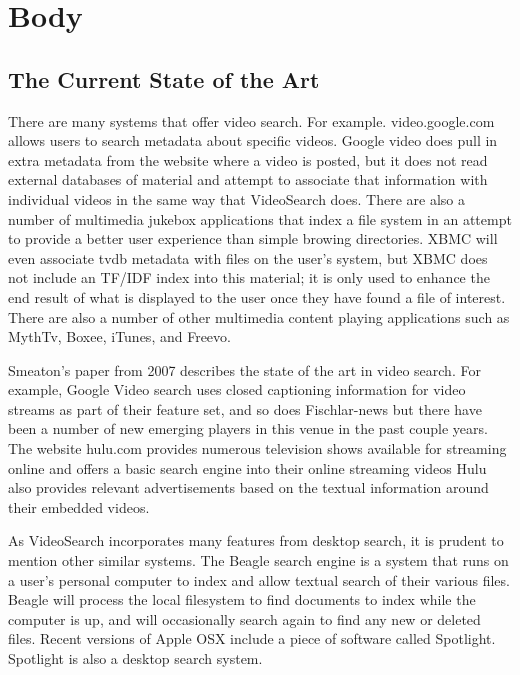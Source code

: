 \documentclass{acm_proc_article-sp}
\begin{document}
\section{Body}
\subsection{The Current State of the Art}

    There are many systems that offer video search.  For example. video.google.com allows users to search metadata about specific videos.  Google video does pull in extra metadata from the website where a video is posted, but it does not read external databases of material and attempt to associate that information with individual videos in the same way that VideoSearch does.  There are also a number of multimedia jukebox applications that index a file system in an attempt to provide a better user experience than simple browing directories. XBMC will even associate tvdb metadata with files on the user’s system\cite{goodwin2010appliance}, but XBMC does not include an TF/IDF index into this material; it is only used to enhance the end result of what is displayed to the user once they have found a file of interest. There are also a number of other multimedia content playing applications such as MythTv, Boxee, iTunes, and Freevo.\cite{schopman2010notube}

    Smeaton’s paper from 2007 describes the state of the art in video search. \cite{smeaton2007techniques} For example, Google Video search uses closed captioning information for video streams as part of their feature set, and so does Fischlar-news \cite{lee2006user} but there have been a number of new emerging players in this venue in the past couple years.  The website hulu.com provides numerous television shows available for streaming online and offers a basic search engine into their online streaming videos \cite{patent:20100287474} Hulu also provides relevant advertisements based on the textual information around their embedded videos.

    As VideoSearch incorporates many features from desktop search, it is prudent to mention other similar systems.  The Beagle search engine is a system that runs on a user\textquoteright s personal computer to index and allow textual search of their various files.  \cite{brunkhorst2006beagle++}  Beagle will process the local filesystem to find documents to index while the computer is up, and will occasionally search again to find any new or deleted files.  Recent versions of Apple OSX include a piece of software called Spotlight.\cite{applex} Spotlight is also a desktop search system.
\end{document}
